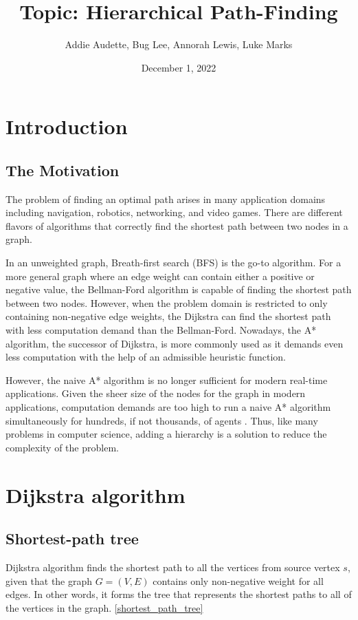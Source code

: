 \documentclass{article}
\title{Topic: Hierarchical Path-Finding}
\author{Addie Audette, Bug Lee, Annorah Lewis, Luke Marks}
\date{December 1, 2022}
\begin{document}
\maketitle

\section{Introduction}
\subsection{The Motivation}
The problem of finding an optimal path arises in many application domains including navigation, robotics, networking, and video games. There are different flavors of algorithms that correctly find the shortest path between two nodes in a graph.  

In an unweighted graph, Breath-first search (BFS) is the go-to algorithm. For a more general graph where an edge weight can contain either a positive or negative value, the Bellman-Ford algorithm is capable of finding the shortest path between two nodes. However, when the problem domain is restricted to only containing non-negative edge weights, the Dijkstra can find the shortest path with less computation demand than the Bellman-Ford. Nowadays, the A* algorithm, the successor of Dijkstra, is more commonly used as it demands even less computation with the help of an admissible heuristic function. 

However, the naive A* algorithm is no longer sufficient for modern real-time applications. Given the sheer size of the nodes for the graph in modern applications, computation demands are too high to run a naive A* algorithm simultaneously for hundreds, if not thousands, of agents \cite{Botea2004NearOH}. Thus, like many problems in computer science, adding a hierarchy is a solution to reduce the complexity of the problem.

\section{Dijkstra algorithm}
\subsection{Shortest-path tree}
Dijkstra algorithm finds the shortest path to all the vertices from source vertex $s$, given that the graph $G = (V, E)$ contains only non-negative weight for all edges. In other words, it forms the tree that represents the shortest paths to all of the vertices in the graph. 
\autoref{shortest_path_tree}
\end{document}

